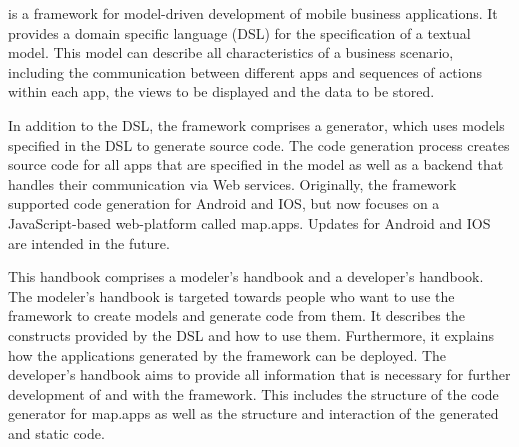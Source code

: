 
\MD is a framework for model-driven development of mobile business applications. It provides a domain specific language (DSL) for the specification of a textual model. This model can describe all characteristics of a business scenario, including the communication between different apps and sequences of actions within each app, the views to be displayed and the data to be stored.

In addition to the DSL, the \MD framework comprises a generator, which uses models specified in the DSL to generate source code. The code generation process creates source code for all apps that are specified in the model as well as a backend that handles their communication via Web services. Originally, the \MD framework supported code generation for Android and IOS, but now focuses on a JavaScript-based web-platform called map.apps. Updates for Android and IOS are intended in the future.

This handbook comprises a modeler's handbook and a developer's handbook. The modeler's handbook is targeted towards people who want to use the \MD framework to create models and generate code from them. It describes the constructs provided by the DSL and how to use them. Furthermore, it explains how the applications generated by the framework can be deployed. The developer's handbook aims to provide all information that is necessary for further development of and with the \MD framework. This includes the structure of the code generator for map.apps as well as the structure and interaction of the generated and static code.
